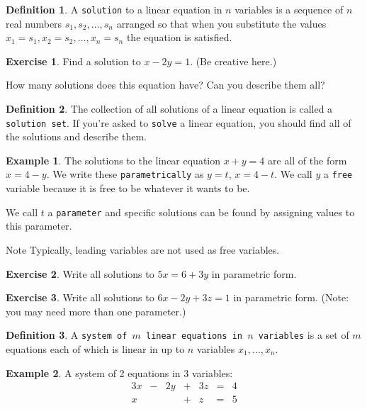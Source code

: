 \documentclass{beamer}
\theoremstyle{definition}
\newtheorem{exercise}{Exercise}
\newtheorem*{defn}{Definition}
\newtheorem*{exa}{Example}
\renewcommand{\emph}[1]{{\color{blue}\texttt{#1}}}
\begin{document}
\begin{frame}{\insertframenumber}
\begin{defn}
	A \emph{solution} to a linear equation in $n$ variables is a sequence of $n$ real numbers $s_1,s_2,\dots,s_n$ arranged so that when you substitute the values $x_1=s_1,x_2=s_2,\dots,x_n=s_n$ the equation is satisfied.
\end{defn}
\pause
\begin{exercise}
	Find a solution to $x-2y=1$.  (Be creative here.)
	
	How many solutions does this equation have?  Can you describe them all?
\end{exercise}
\end{frame}

\begin{frame}{\insertframenumber}
\begin{defn}
	The collection of all solutions of a linear equation is called a \emph{solution set}.  If you're asked to \emph{solve} a linear equation, you should find all of the solutions and describe them.
\end{defn}
\begin{exa}
	The solutions to the linear equation $x+y=4$ are all of the form $x=4-y$.
	We write these \emph{parametrically} as $y=t$, $x=4-t$. We call $y$ a \emph{free} variable because it is free to be whatever it wants to be.
	
	We call $t$ a \emph{parameter} and specific solutions can be found by assigning values to this parameter.
\end{exa}
\begin{block}{Note}
	Typically, leading variables are not used as free variables.
\end{block}
\end{frame}

\begin{frame}{\insertframenumber}
\begin{exercise}
	Write all solutions to $5x=6+3y$ in parametric form.
\end{exercise}
\begin{exercise}
	Write all solutions to $6x-2y+3z=1$ in parametric form.  (Note: you may need more than one parameter.)
\end{exercise}
\end{frame}

\begin{frame}{\insertframenumber}
\begin{defn}
	A \emph{system of $m$ linear equations in $n$ variables} is a set of $m$ equations each of which is linear in up to $n$ variables $x_1,\dots,x_n$.
\end{defn}
\begin{exa}
	A system of 2 equations in 3 variables:	
		\[\begin{array}{rcrcrcl}
			3x&-&2y&+&3z&=&4\\
			x&&&+&z&=&5\\
		\end{array}\]
\end{exa}
\end{frame}
\end{document}
